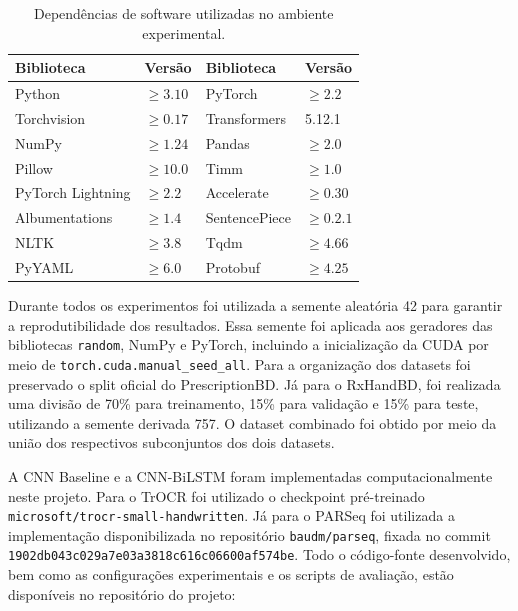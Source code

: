\documentclass[11pt,a4paper]{article}
\begin{document}
\begin{table}[htbp]
	\centering
	\caption{Dependências de software utilizadas no ambiente experimental.}
	\label{tab:software}
	\begin{tabular}{llll}
		\toprule
		\textbf{Biblioteca} & \textbf{Versão} &
		\textbf{Biblioteca} & \textbf{Versão} \\
		\midrule
		Python            & $\geq 3.10$   & PyTorch          & $\geq 2.2$  \\
		Torchvision       & $\geq 0.17$   & Transformers     & 5.12.1       \\
		NumPy             & $\geq 1.24$   & Pandas           & $\geq 2.0$  \\
		Pillow            & $\geq 10.0$   & Timm             & $\geq 1.0$  \\
		PyTorch Lightning & $\geq 2.2$    & Accelerate       & $\geq 0.30$ \\
		Albumentations    & $\geq 1.4$    & SentencePiece    & $\geq 0.2.1$ \\
		NLTK              & $\geq 3.8$    & Tqdm             & $\geq 4.66$ \\
		PyYAML            & $\geq 6.0$    & Protobuf         & $\geq 4.25$ \\
		\bottomrule
	\end{tabular}
\end{table}

Durante todos os experimentos foi utilizada a semente aleatória 42 para garantir
a reprodutibilidade dos resultados. Essa semente foi aplicada aos geradores das
bibliotecas \texttt{random}, NumPy e PyTorch, incluindo a inicialização da CUDA
por meio de \texttt{torch.cuda.manual\_seed\_all}. Para a organização dos
datasets foi preservado o split oficial do PrescriptionBD. Já para o RxHandBD,
foi realizada uma divisão de 70\% para treinamento, 15\% para validação e 15\%
para teste, utilizando a semente derivada 757. O dataset combinado foi obtido
por meio da união dos respectivos subconjuntos dos dois datasets.

A CNN Baseline e a CNN-BiLSTM foram implementadas computacionalmente neste
projeto. Para o TrOCR foi utilizado o checkpoint pré-treinado
\texttt{microsoft/trocr-small-handwritten}. Já para o PARSeq foi utilizada a
implementação disponibilizada no repositório \texttt{baudm/parseq}, fixada no
commit \texttt{1902db043c029a7e03a3818c616c06600af574be}. Todo o código-fonte
desenvolvido, bem como as configurações experimentais e os scripts de avaliação,
estão disponíveis no repositório do projeto:
\end{document}
